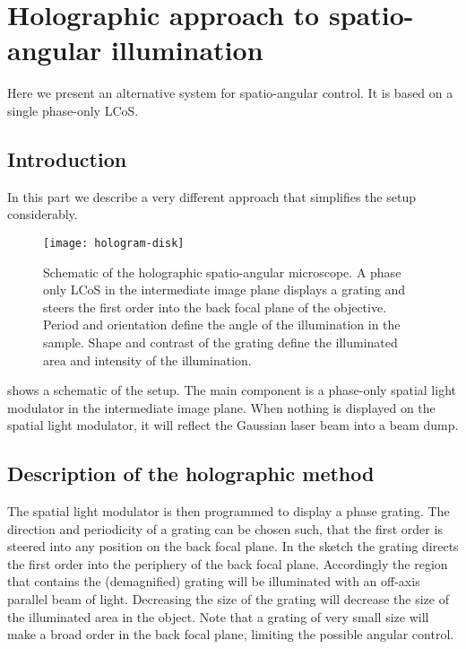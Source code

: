 \chapter{Holographic approach to spatio-angular illumination}
\begin{summary}
  Here we present an alternative system for spatio-angular control. It
  is based on a single phase-only LCoS.
\end{summary}

\section{Introduction}
In this part we describe a very different approach that simplifies the
setup considerably.

\begin{figure}[!hbt]
  \centering
  
  \texttt{[image: hologram-disk]}
  \caption{Schematic of the holographic spatio-angular microscope. A
    phase only LCoS in the intermediate image plane displays a grating
    and steers the first order into the back focal plane of the
    objective. Period and orientation define the angle of the
    illumination in the sample. Shape and contrast of the grating
    define the illuminated area and intensity of the illumination.}
  \label{fig:holo-setup3}
\end{figure}

 shows a schematic of the setup. The main
component is a phase-only spatial light modulator in the intermediate
image plane. When nothing is displayed on the spatial light modulator,
it will reflect the Gaussian laser beam into a beam dump.

\section{Description of the holographic method}
The spatial light modulator is then programmed to display a phase
grating.  The direction and periodicity of a grating can be chosen
such, that the first order is steered into any position on the back
focal plane. In the sketch the grating directs the first order into
the periphery of the back focal plane. Accordingly the region that
contains the (demagnified) grating will be illuminated with an
off-axis parallel beam of light. Decreasing the size of the grating will
decrease the size of the illuminated area in the object. Note that a
grating of very small size will make a broad order in the back focal
plane, limiting the possible angular control.
